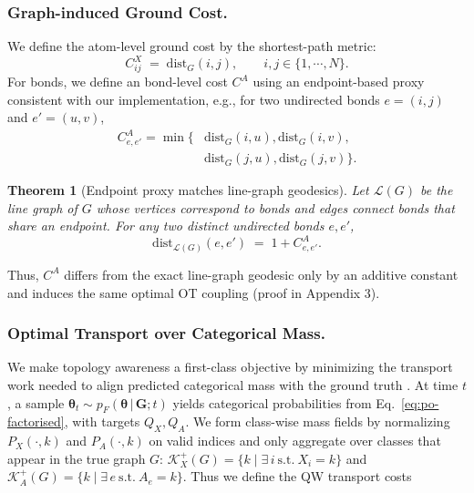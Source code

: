 \documentclass[journal,twoside,web]{ieeecolor}
\newtheorem{theorem}{Theorem}
\begin{document}
\subsubsection{Graph-induced Ground Cost.}
We define the atom-level ground cost by the shortest-path metric: 
\begin{equation}
    C^{X}_{ij} \;=\; \mathrm{dist}_{G}(i,j),\qquad i,j\in\{1,\cdots,N\}.
\label{eq:cost_X}
\end{equation}
For bonds, we define an bond-level cost $C^{A}$ using an endpoint-based proxy consistent with our implementation, e.g., for two undirected bonds $e=(i,j)$ and $e'=(u,v)$,
\begin{equation}
\begin{aligned}
C^{A}_{e,e'} = \min \big\{ & \mathrm{dist}_{G}(i,u), \mathrm{dist}_{G}(i,v), \\
& \mathrm{dist}_{G}(j,u), \mathrm{dist}_{G}(j,v) \big\}.
\label{eq:cost_A}
\end{aligned}
\end{equation}
\begin{theorem}[Endpoint proxy matches line-graph geodesics]
\label{thm:line_graph}
Let $\mathcal{L}(G)$ be the line graph of $G$ whose vertices correspond to bonds and edges connect bonds that share an endpoint. For any two distinct undirected bonds $e,e'$,
\[
\mathrm{dist}_{\mathcal{L}(G)}(e,e') \;=\; 1 + C^{A}_{e,e'} .
\]
\end{theorem}
Thus, $C^{A}$ differs from the exact line-graph geodesic only by an additive constant and induces the same optimal OT coupling (proof in Appendix 3).

\subsubsection{Optimal Transport over Categorical Mass.}
We make topology awareness a first-class objective by minimizing the transport work needed to align predicted categorical mass with the ground truth \cite{peyre2016gromov}.
At time $t$, a sample $\boldsymbol{\theta}_t\sim p_F(\boldsymbol{\theta} \,|\, \mathbf{G};t)$ yields categorical probabilities from Eq.~\eqref{eq:po-factorised}, with targets $Q_X,Q_A$. We form class-wise mass fields by normalizing $P_X(\cdot,k)$ and $P_A(\cdot,k)$ on valid indices and only aggregate over classes that appear in the true graph $G$: $\mathcal{K}_X^{+}(G)=\{k \mid \exists\, i \ \text{s.t.}\ X_i=k\}$ and $\mathcal{K}_A^{+}(G)=\{k \mid \exists\, e \ \text{s.t.}\ A_e=k\}$. Thus we define the QW transport costs
\end{document}
